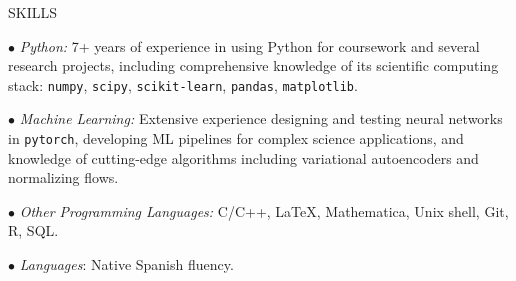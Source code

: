 \documentclass{resume} %
\newcommand{\pytorch}[0]{\texttt{pytorch}}
\begin{document}
\begin{rSection}{SKILLS}
\vspace*{-0.3cm}
\item {\small $\bullet$} \textit{Python:} 7+ years of experience in using Python for coursework and several research projects, including comprehensive knowledge of its scientific computing stack: \texttt{numpy}, \texttt{scipy}, \texttt{scikit-learn}, \texttt{pandas}, \texttt{matplotlib}.

\item {\small $\bullet$} \textit{Machine Learning:} Extensive experience designing and testing neural networks in \pytorch, developing ML pipelines for complex science applications, and knowledge of cutting-edge algorithms including variational autoencoders and normalizing flows.

\item {\small $\bullet$} \textit{Other Programming Languages:} C/C++, \LaTeX, Mathematica, Unix shell, Git, R, SQL.

\item {\small $\bullet$} \textit{Languages}: Native Spanish fluency.
\end{rSection}


\end{document}

